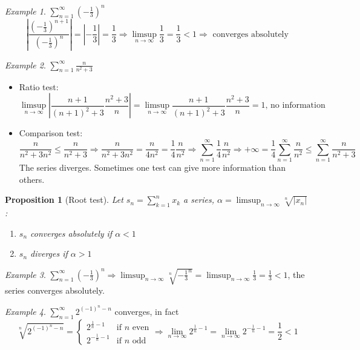 \documentclass{article}
\newcommand{\DS}{\displaystyle}
\newcommand{\abs}[1]{\left|#1\right|}
\newcommand{\Ar}{\Rightarrow}
\newenvironment{enumrom}{\begin{enumerate}[label=(\roman*)]}{\end{enumerate}}
\newcommand{\fr}[2]{\frac{#1}{#2}}
\newcommand{\limn}{\lim_{n \to \infty}}
\newcommand{\limsupn}{\limsup_{n \to \infty}}
\theoremstyle{definition}
\theoremstyle{definition}
\theoremstyle{plain}
\theoremstyle{plain}
\theoremstyle{plain}
\theoremstyle{plain}
\newtheorem{proposition}[theorem]{Proposition}
\theoremstyle{definition}
\theoremstyle{remark}
\theoremstyle{remark}
\theoremstyle{remark}
\newtheorem{examplet}{Example}[theorem]
\theoremstyle{remark}
\newcommand{\sumn}{\sum_{k=1}^n}
\newcommand{\series}{\sum_{n=1}^\infty}
\begin{document}
\begin{examplet}
  $\DS \series\left({-\fr{1}{3}}\right)^n$
  \[
  \abs{\fr{(-\fr{1}{3})^{n+1}}{(-\fr{1}{3})^n}} = \abs{-\fr{1}{3}}
  = \fr{1}{3} \Ar \limsupn \fr{1}{3} = \fr{1}{3} < 1 \Ar
  \text{ converges absolutely}
  \]
\end{examplet}

\begin{examplet}
  $\DS \series \fr{n}{n^2+3}$
  \begin{itemize}
  \item Ratio test:
    \[
    \limsupn \abs{\fr{n+1}{(n+1)^2+3}\fr{n^2+3}{n}} =
    \limsupn \fr{n+1}{(n+1)^2+3}\fr{n^2+3}{n} = 1 \text{, no information}
    \]
  \item Comparison test:
    \[
    \fr{n}{n^2+3n^2} \leq \fr{n}{n^2+3} \Ar
    \fr{n}{n^2+3n^2} = \fr{n}{4n^2} = \fr{1}{4} \fr{n}{n^2}
    \Ar \series \fr{1}{4} \fr{n}{n^2} \Ar
    + \infty = \fr{1}{4} \series \fr{n}{n^2} \leq \series \fr{n}{n^2+3}
    \]
    The series diverges. Sometimes one test can give more information than others.
  \end{itemize}
\end{examplet}


\begin{proposition}[Root test]
  Let $\DS s_n = \sumn{x_k}$ a series, $\DS \alpha = \limsupn \sqrt[n]{\abs{x_n}}$:
  \begin{enumrom}
    \item $s_n$ converges absolutely if $\alpha < 1$
    \item $s_n$ diverges if $\alpha > 1$
  \end{enumrom}
\end{proposition}


\begin{examplet}
  $\DS \series\left({-\frac{1}{3}}\right)^n \Ar \limsupn \sqrt[n]{-\frac{1}{3}^n} = \limsupn \frac{1}{3} = \frac{1}{3} < 1$, the series converges absolutely.
\end{examplet}

\begin{examplet}
  $\DS \series 2^{(-1)^n-n}$ converges, in fact
  \[
  \sqrt[n]{2^{(-1)^n-n}} =
  \begin{cases}
    2^{\frac{1}{n}-1}  & \text{if } n \text{ even} \\
    2^{-\frac{1}{n}-1} & \text{if } n \text{ odd}
  \end{cases} \Ar
  \limn 2^{\frac{1}{n}-1} = \limn 2^{-\frac{1}{n}-1} = \frac{1}{2} < 1
  \]
\end{examplet}
\end{document}

